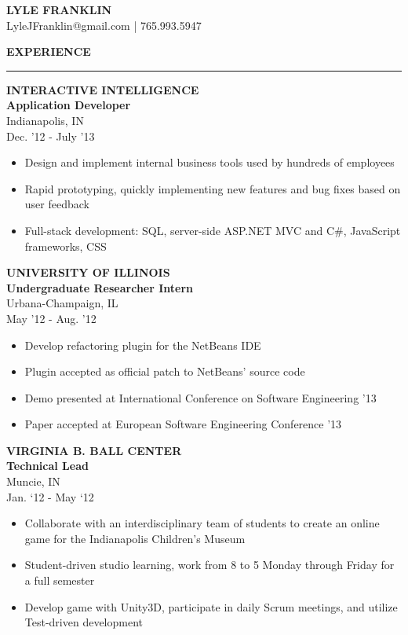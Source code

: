 \documentclass[a4paper,10pt]{article}
\newcommand{\name}[1]{\textbf{\huge{#1}}}
\newcommand{\header}[1]
{
{\Large \textbf {\uppercase{#1}}}
\vspace{0.05in}
\hrule
\vspace{0.15in}
}
\newenvironment{details}
{\begin{itemize}[label=\scalebox{.5}{\ding{117}},leftmargin=0.15in]}
{\end{itemize}}
\begin{document}
\name{LYLE FRANKLIN}\\
\indent
LyleJFranklin@gmail.com | 765.993.5947

\vspace{0.2in}

\begin{minipage}[t]{0.5\textwidth}
\header{Experience}

\textbf{INTERACTIVE INTELLIGENCE\\Application Developer}\\
Indianapolis, IN\\
Dec. '12 - July '13

\begin{details}
  \item Design and implement internal business tools used by hundreds of employees
  \item Rapid prototyping, quickly implementing new features and bug fixes based on user feedback
  \item Full-stack development: SQL, server-side ASP.NET MVC and C\#, JavaScript frameworks, CSS
\end{details}


\textbf{UNIVERSITY OF ILLINOIS\\Undergraduate Researcher Intern}\\
Urbana-Champaign, IL\\
May '12 - Aug. '12

\begin{details}
  \item Develop refactoring plugin for the NetBeans IDE
  \item Plugin accepted as official patch to NetBeans’ source code
  \item Demo presented at International Conference on Software Engineering '13
  \item Paper accepted at European Software Engineering Conference '13
\end{details}

\textbf{VIRGINIA B. BALL CENTER\\Technical Lead}\\
Muncie, IN\\
Jan. ‘12 - May ‘12

\begin{details}
  \item Collaborate with an interdisciplinary team of students to create
an online game for the Indianapolis Children’s Museum
  \item Student-driven studio learning, work from 8 to 5 Monday
through Friday for a full semester
  \item Develop game with Unity3D, participate in daily Scrum meetings, and utilize Test-driven
development
\end{details}


\end{minipage}
\end{document}
